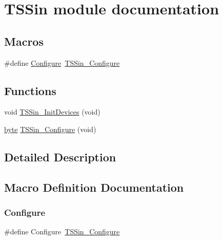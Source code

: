 \hypertarget{group___t_s_sin__module}{}\section{T\+S\+Sin module documentation}
\label{group___t_s_sin__module}
\subsection*{Macros}
\begin{DoxyCompactItemize}
\item 
\#define \hyperlink{group___t_s_sin__module_ga95be40c89c4e9dadb7c9b3c72e4ff233}{Configure}~\hyperlink{group___t_s_sin__module_ga06541a8e9e8f596f58da8cc5ec89c6a2}{T\+S\+Sin\+\_\+\+Configure}
\end{DoxyCompactItemize}
\subsection*{Functions}
\begin{DoxyCompactItemize}
\item 
void \hyperlink{group___t_s_sin__module_gaaa9dfcc11b1358aabe0032cb55aa8b66}{T\+S\+Sin\+\_\+\+Init\+Devices} (void)
\item 
\hyperlink{group___p_e___types__module_ga0c8186d9b9b7880309c27230bbb5e69d}{byte} \hyperlink{group___t_s_sin__module_ga06541a8e9e8f596f58da8cc5ec89c6a2}{T\+S\+Sin\+\_\+\+Configure} (void)
\end{DoxyCompactItemize}


\subsection{Detailed Description}


\subsection{Macro Definition Documentation}
\mbox{\label{group___t_s_sin__module_ga95be40c89c4e9dadb7c9b3c72e4ff233}} 
\subsubsection{\texorpdfstring{Configure}{Configure}}
{\footnotesize\ttfamily \#define Configure~\hyperlink{group___t_s_sin__module_ga06541a8e9e8f596f58da8cc5ec89c6a2}{T\+S\+Sin\+\_\+\+Configure}}



